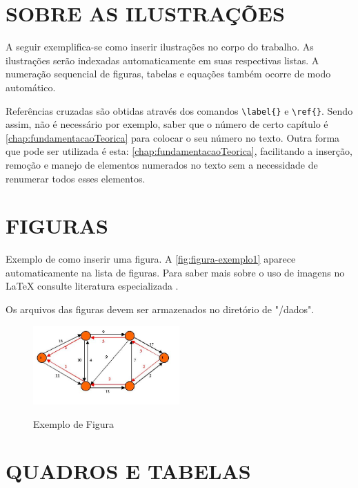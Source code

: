\chapter{SOBRE AS ILUSTRAÇÕES}
\label{chap:apSobreIlust}

A seguir exemplifica-se como inserir ilustrações no corpo do trabalho. As ilustrações serão indexadas automaticamente em suas respectivas listas. A numeração sequencial de figuras, tabelas e equações também ocorre de modo automático.

Referências cruzadas são obtidas através dos comandos \verb|\label{}| e \verb|\ref{}|. Sendo assim, não é necessário por exemplo, saber que o número de certo capítulo é \ref{chap:fundamentacaoTeorica} para colocar o seu número no texto. Outra forma que pode ser utilizada é esta: \autoref{chap:fundamentacaoTeorica}, facilitando a inserção, remoção e manejo de elementos numerados no texto sem a necessidade de renumerar todos esses elementos.

\chapter{FIGURAS}
\label{chap:figuras}

Exemplo de como inserir uma figura. A \autoref{fig:figura-exemplo1} aparece automaticamente na lista de figuras. Para saber mais sobre o uso de imagens no \LaTeX{} consulte literatura especializada \cite{Goossens2007}.

Os arquivos das figuras devem ser armazenados no diretório de "/dados".

\begin{figure}[!htb]
    \centering
    \caption{Exemplo de Figura}
    \includegraphics[width=0.5\textwidth]{figuras/figura1}
    \label{fig:figura-exemplo1}
\end{figure}

\chapter{QUADROS E TABELAS}
\label{chap:tabelas}

